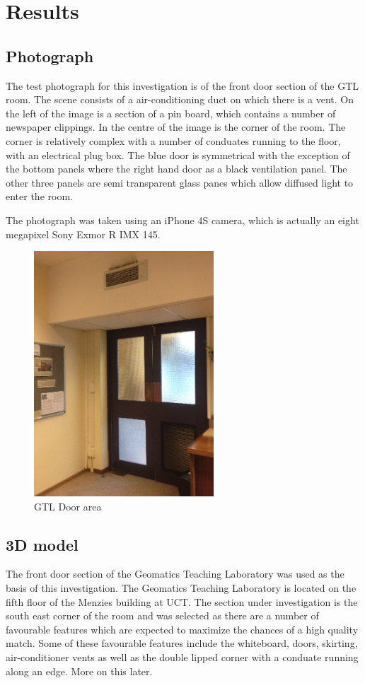 \documentclass[11pt,a4paper]{report}
\begin{document}
\chapter{Results}
	\section{Photograph}
		The test photograph for this investigation is of the front door section of the GTL room. The scene consists of a air-conditioning duct on which there is a vent. On the left of the image is a section of a pin board, which contains a number of newspaper clippings. In the centre of the image is the corner of the room. The corner is relatively complex with a number of conduates running to the floor, with an electrical plug box. The blue door is symmetrical with the exception of the bottom panels where the right hand door as a black ventilation panel. The other three panels are semi transparent glass panes which allow diffused light to enter the room.
		
		The photograph was taken using an iPhone 4S camera, which is actually an eight megapixel Sony Exmor R IMX 145.
		
		\begin{figure}[h!]
			\centering
			\includegraphics[width=0.6\textwidth]{gtl_door_area}
			\caption{GTL Door area}
		\end{figure}
		
	\section{3D model}
		The front door section of the Geomatics Teaching Laboratory was used as the basis of this investigation. The Geomatics Teaching Laboratory is located on the fifth floor of the Menzies building at UCT. The section under investigation is the south east corner of the room and was selected as there are a number of favourable features which are expected to maximize the chances of a high quality match. Some of these favourable features include the whiteboard, doors, skirting, air-conditioner vents as well as the double lipped corner with a conduate running along an edge. More on this later.
\end{document}
